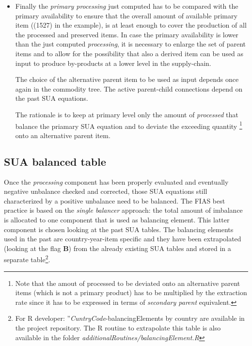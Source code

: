 \documentclass[nojss]{jss}
\begin{document}
\begin{itemize}
\begin{table}[t]
\begin{tabular}{c|c|c|c|c|c}
\bottomrule
\end{tabular}
\label{tab:xxx}
\end{table}

\item Finally the \textit{primary processing} just computed has to be compared with the primary availability to ensure that the overall amount of available primary item ((1527) in the example), is at least enough to cover the production of all the processed and preserved items. In case the primary availability is lower than the just computed \textit{processing}, it is necessary to enlarge the set of parent items and to allow for the possibility that also a derived item can be used as input to produce by-products at a lower level in the supply-chain.

The choice of the alternative parent item to be used as input depends once again in the commodity tree. The active parent-child connections depend on the past SUA equations. 

The rationale is to keep at primary level only the amount of \textit{processed} that balance the priamary SUA equation and to deviate the exceeding quantity \footnote{Note that the amout of processed to be deviated onto an alternative parent items (which is not a primary product) has to be multiplied by the extraction rate since it has to be expressed in terms of \textit{secondary parent} equivalent.} onto an alternative parent item.

\end{itemize}




\subsection{SUA balanced table}
Once the \textit{processing} component has been properly evaluated and eventually negative unbalance checked and corrected,  those SUA equations still characterized by a positive unbalance need to be balanced. The FIAS best practice is based on the \textit{single balancer} approach: the total amount of imbalance is allocated to one component that is used as balancing element. This latter component is chosen looking at the past SUA tables. The balancing elements used in the past are country-year-item specific and they have been extrapolated (looking at the flag \textbf{B}) from the already existing SUA tables and stored in a separate table\footnote{For R developer: ''\textit{CuntryCode}-balancingElements by country are available in the project repository. The R routine to extrapolate this table is also available in the folder \textit{additionalRoutines/balancingElement.R}}.
\end{document}
